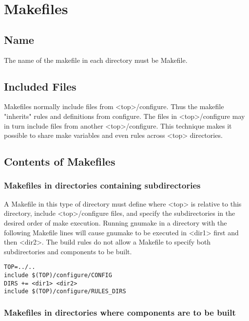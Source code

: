 \section{Makefiles}

\subsection{Name}

The name of the makefile in each directory must be Makefile.

\subsection{Included Files}

Makefiles normally include files from \textless{}top\textgreater{}/configure. Thus the makefile "inherits" rules and definitions from configure. 
The files in \textless{}top\textgreater{}/configure may in turn include files from another \textless{}top\textgreater{}/configure. This technique makes it possible to 
share make variables and even rules across \textless{}top\textgreater{} directories.

\subsection{Contents of Makefiles}

\subsubsection{Makefiles in directories containing subdirectories}

A Makefile in this type of directory must define where \textless{}top\textgreater{} is relative to this directory, include \textless{}top\textgreater{}/configure files, 
and specify the subdirectories in the desired order of make execution. Running gnumake in a directory with the following 
Makefile lines will cause gnumake to be executed in \textless{}dir1\textgreater{} first and then \textless{}dir2\textgreater{}. The build rules do not allow a Makefile 
to specify both subdirectories and components to be built.

\begin{verbatim}TOP=../..
include $(TOP)/configure/CONFIG
DIRS += <dir1> <dir2>
include $(TOP)/configure/RULES_DIRS

\end{verbatim}\subsubsection{Makefiles in directories where components are to be built}

